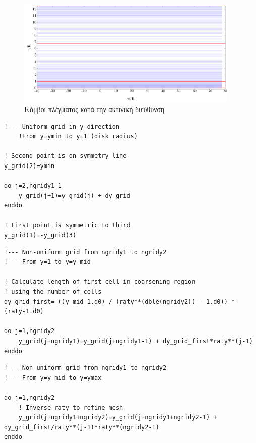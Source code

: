 \begin{figure}
    \begin{center}
        \includegraphics[width=0.95\textwidth]{figures/gridy.pdf}
    \end{center}
    \caption{Κόμβοι πλέγματος κατά την ακτινική διεύθυνση}
    \label{fig:ygrid}
\end{figure}


    \begin{lstlisting}[caption=\textrm{Κατασκευή ομοιόμορφου πλέγματος}, label={lst:yuni}, mathescape=true, breaklines=true, linewidth=.6\textwidth]
!--- Uniform grid in y-direction 
    !From y=ymin to y=1 (disk radius)

! Second point is on symmetry line
y_grid(2)=ymin 

do j=2,ngridy1-1
    y_grid(j+1)=y_grid(j) + dy_grid
enddo

! First point is symmetric to third
y_grid(1)=-y_grid(3) 
\end{lstlisting}

\begin{lstlisting}[caption=\textrm{Αραίωση πλέγματος}, label={lst:ycoarse}, mathescape=true, breaklines=true, linewidth=.6\textwidth]
!--- Non-uniform grid from ngridy1 to ngridy2
!--- From y=1 to y=y_mid 

! Calculate length of first cell in coarsening region
! using the number of cells
dy_grid_first= ((y_mid-1.d0) / (raty**(dble(ngridy2)) - 1.d0)) * (raty-1.d0)

do j=1,ngridy2
    y_grid(j+ngridy1)=y_grid(j+ngridy1-1) + dy_grid_first*raty**(j-1)
enddo
\end{lstlisting}

\begin{lstlisting}[caption=\textrm{Πύκνωση πλέγματος}, label={lst:yfine}, mathescape=true, breaklines=true, linewidth=.6\textwidth]
!--- Non-uniform grid from ngridy1 to ngridy2
!--- From y=y_mid to y=ymax 

do j=1,ngridy2
    ! Inverse raty to refine mesh
    y_grid(j+ngridy1+ngridy2)=y_grid(j+ngridy1+ngridy2-1) + dy_grid_first/raty**(j-1)*raty**(ngridy2-1)
enddo
\end{lstlisting}


